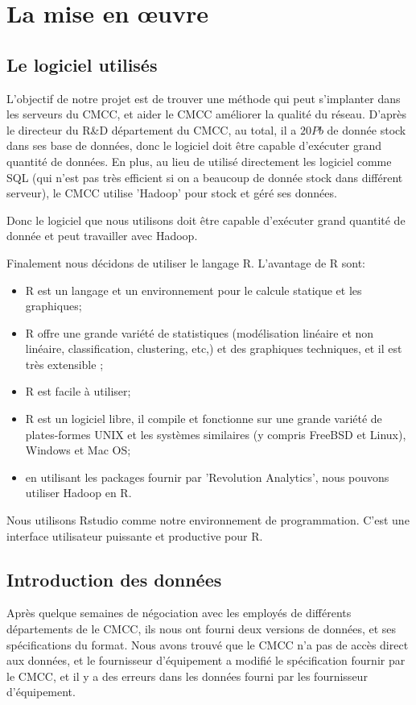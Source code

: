 \section{La mise en \oe uvre}
\subsection{Le logiciel utilisés}
L'objectif de notre projet est de trouver une méthode qui peut s'implanter dans les serveurs du CMCC, et aider le CMCC améliorer la qualité du réseau. D'après le directeur du R\&D département du CMCC, au total, il a $20Pb$ de donnée stock dans ses base de données, donc le logiciel doit être capable d'exécuter grand quantité de données. En plus,  au lieu de utilisé directement les logiciel comme SQL (qui n'est pas très efficient si on a beaucoup de donnée stock dans différent serveur), le CMCC utilise 'Hadoop' pour stock et géré ses données.

Donc le logiciel que nous utilisons doit être capable d'exécuter grand quantité de donnée et peut travailler avec Hadoop. 

Finalement nous décidons de utiliser le langage \textsf{R}. L'avantage de R sont:

\begin{itemize}
\item R est un langage et un environnement pour le calcule statique et les graphiques; 
\item R offre une grande variété de statistiques (modélisation linéaire et non linéaire, classification, clustering, etc,) et des graphiques techniques, et il est très extensible ;
\item R est facile à utiliser; 
\item R est un logiciel libre, il compile et fonctionne sur une grande variété de plates-formes UNIX et les systèmes similaires (y compris FreeBSD et Linux), Windows et Mac OS;
\item en utilisant les packages fournir par 'Revolution Analytics', nous pouvons utiliser Hadoop en R.
\end{itemize}

Nous utilisons \textsf{Rstudio} comme notre environnement de programmation. C'est une interface utilisateur puissante et productive pour R.

\subsection{Introduction des données}
Après quelque semaines de négociation avec les employés de différents départements de le CMCC, ils nous ont fourni deux versions de données, et ses spécifications du format\cite{specifi}. Nous avons trouvé que le CMCC n'a pas de accès direct aux données, et le fournisseur d'équipement a modifié le spécification fournir par le CMCC, et il y a des erreurs dans les données fourni par les fournisseur d'équipement.

